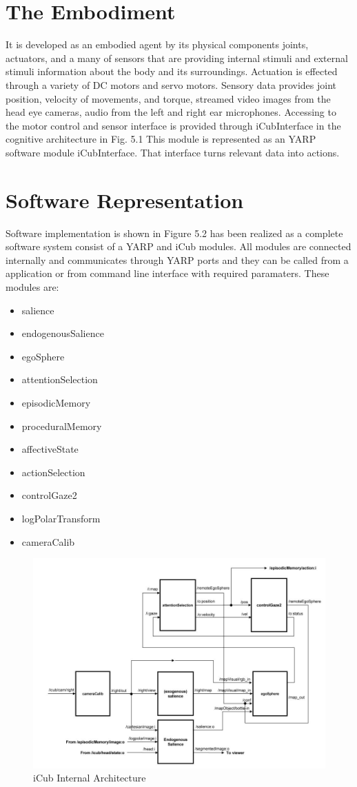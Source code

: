 \documentclass[a4paper, 12pt]{report}
\begin{document}
\section{The Embodiment}
It is developed as an embodied agent by its physical components joints, 
actuators, and a many of sensors that are providing internal stimuli and 
external stimuli information about the body and its 
surroundings.\textbf{\cite{vernon}} 
Actuation is effected through a variety of DC motors and servo motors. Sensory 
data provides joint position, velocity of movements, and torque, streamed video 
images from the head eye cameras, audio from the left and right ear 
microphones. Accessing to the motor control and sensor 
interface is provided through iCubInterface in the cognitive architecture in 
Fig. 5.1 This module is represented as an YARP software module iCubInterface.
That interface turns relevant data into actions.
\section{Software Representation}
Software implementation is shown in Figure 5.2 has been realized as a complete 
software system consist of a YARP and iCub modules. All modules are connected 
internally and communicates through YARP ports and they can be called from a 
application or from command line interface with required paramaters. These 
modules are:
\begin{itemize}
  \item salience
  \item endogenousSalience
  \item egoSphere
  \item attentionSelection
  \item episodicMemory
  \item proceduralMemory
  \item affectiveState
  \item actionSelection
  \item controlGaze2
  \item logPolarTransform
  \item cameraCalib
\end{itemize}
\begin{figure}[h!]
  \centering
  \includegraphics[width=0.8\linewidth]{cognitive_architecture_A}
  \caption{iCub Internal Architecture}
  \label{fig:cognitive_architecture_A}
\end{figure} 
\end{document}
